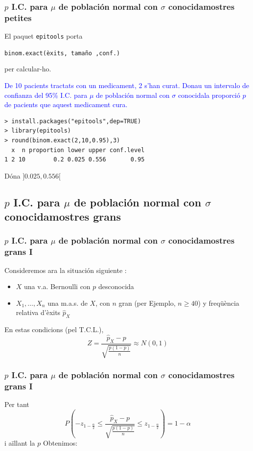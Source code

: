 \documentclass[12pt,t]{beamer}\usepackage[]{graphicx}\usepackage[]{color}
\newcommand{\blue}[1]{\textcolor{blue}{#1}}
\renewcommand{\leq}{\leqslant}
\renewcommand{\geq}{\geqslant}
\theoremstyle{plain}
\theoremstyle{definition}
\begin{document}
\begin{frame}[fragile]
\frametitle{$p$ I.C. para $\mu$ de población normal con $\sigma$ conocidamostres petites}
\vspace*{-2ex}

El paquet \texttt{epitools} porta
\begin{center}
{\tt binom.exact(èxits, tamaño ,conf.)}
\end{center}
per calcular-ho.
\medskip

\blue{De 10 pacients tractats con un medicament, 2 s'han curat. Donau un intervalo de confianza  del 95\% I.C. para $\mu$ de población normal con $\sigma$ conocidala proporció $p$ de pacients que aquest medicament cura.}
\begin{verbatim}
> install.packages("epitools",dep=TRUE)
> library(epitools)
> round(binom.exact(2,10,0.95),3)
  x  n proportion lower upper conf.level
1 2 10        0.2 0.025 0.556       0.95
\end{verbatim}
Dóna $]0.025,0.556[$
\end{frame}

\subsection{$p$ I.C. para $\mu$ de población normal con $\sigma$ conocidamostres grans}


\begin{frame}
\frametitle{$p$ I.C. para $\mu$ de población normal con $\sigma$ conocidamostres grans I}

Consideremos ara la situación siguiente  :
\begin{itemize}
\item  $X$ una v.a. Bernoulli con $p$ desconocida

\item $X_1,\ldots,X_n$ una m.a.s. de $X$, con $n$  gran (per Ejemplo, $n\geq 40$) y freqüència relativa d'èxits $\widehat{p}_{X}$
\end{itemize}
\medskip

En estas  condicions (pel T.C.L.), 
$$
Z=\dfrac{\widehat{p}_{X}-p}
{\sqrt{\frac{p(1-p)}{n}}}\approx N(0,1)
$$
\end{frame}


\begin{frame}
\frametitle{$p$ I.C. para $\mu$ de población normal con $\sigma$ conocidamostres grans I}
Per tant
$$
P\left(-z_{1-\frac{\alpha}{2}}\leq \dfrac{\widehat{p}_{X}-p}
{\sqrt{\frac{p(1-p)}{n}}}\leq z_{1-\frac{\alpha}{2}}\right)=1-\alpha
$$
i aïllant la $p$ Obtenimos:
\end{frame}
\end{document}
